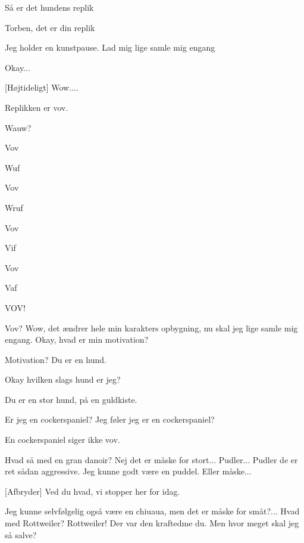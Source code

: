 \documentclass[a4paper,11pt]{article}
\begin{document}
\begin{sketch}
 Så er det hundens replik

 

 Torben, det er din replik

 Jeg holder en kunstpause. Lad mig lige samle mig engang

 Okay...

[Højtideligt] Wow....

 Replikken er vov.

 Wauw?

 Vov

 Wuf

 Vov

 Wruf

 Vov

 Vif

 Vov

 Vaf

 VOV!

 Vov? Wow, det ændrer hele min karakters opbygning, nu skal jeg lige samle mig engang.  Okay, hvad er min motivation?

 Motivation? Du er en hund.

 Okay hvilken slags hund er jeg?

 Du er en stor hund, på en guldkiste.

 Er jeg en cockerspaniel? Jeg føler jeg er en cockerspaniel?

 En cockerspaniel siger ikke vov.

 Hvad så med en gran danoir? Nej det er måske for stort... Pudler... Pudler de er ret sådan aggressive. Jeg kunne godt være en puddel. Eller måske...

[Afbryder] Ved du hvad, vi stopper her for idag. 

  Jeg kunne selvfølgelig også være en chiuaua, men det er måske for småt?... Hvad med Rottweiler? Rottweiler! Der var den kraftedme du.  Men hvor meget skal jeg så salve?


\end{sketch}
\end{document}
